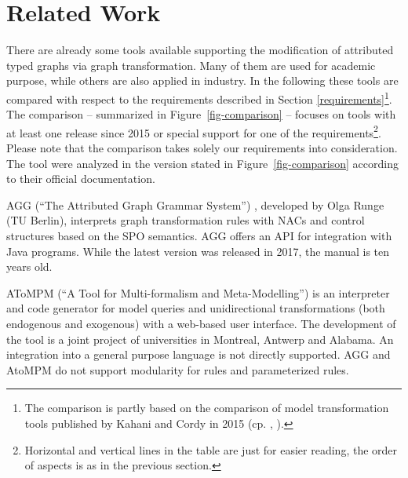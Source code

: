 \section{Related Work}
\label{related-work}
There are already some tools available supporting the modification of attributed typed graphs via graph transformation.
Many of them are used for academic purpose, while others are also applied in industry.
In the following these tools are compared with respect to the requirements described in Section \ref{requirements}\footnote{The comparison is partly based on the comparison of model transformation tools published by Kahani and Cordy in 2015 (cp. \cite{ComparisonAndEvaluationOfModelTransformationTools}, \cite{ComparisonOfModelTransformationToolsWebsite}).}.
The comparison -- summarized in Figure~\ref{fig-comparison} -- focuses on tools with at least one release since 2015 or special support for one of the requirements\footnote{Horizontal and vertical lines in the table are just for easier reading, the order of aspects is as in the previous section.}.
Please note that the comparison takes solely our requirements into consideration.
The tool were analyzed in the version stated in Figure~\ref{fig-comparison} according to their official documentation.

AGG (``The Attributed Graph Grammar System'') \cite{AGGWebsite}, developed by Olga Runge (TU Berlin), interprets graph transformation rules with NACs and control structures based on the SPO semantics.
AGG offers an API for integration with Java programs.
While the latest version was released in 2017, the manual \cite{AGGManual} is ten years old.
 
AToMPM (``A Tool for Multi-formalism and Meta-Modelling'') \cite{AToMPMDocs} is an interpreter and code generator for model queries and unidirectional transformations (both endogenous and exogenous) with a web-based user interface.
The development of the tool is a joint project of universities in Montreal, Antwerp and Alabama.
An integration into a general purpose language is not directly supported.
AGG and AtoMPM do not support modularity for rules and parameterized rules.

